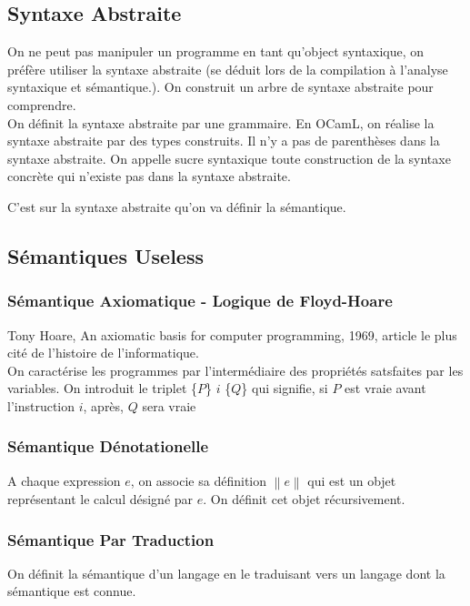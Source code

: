 \documentclass{cours}
\begin{document}
\subsection{Syntaxe Abstraite}
On ne peut pas manipuler un programme en tant qu'object syntaxique, on préfère utiliser la syntaxe abstraite (se déduit lors de la compilation à l'analyse syntaxique et sémantique.). On construit un arbre de syntaxe abstraite pour comprendre.\\
On définit la syntaxe abstraite par une grammaire. En OCamL, on réalise la syntaxe abstraite par des types construits. Il n'y a pas de parenthèses dans la syntaxe abstraite. On appelle sucre syntaxique toute construction de la syntaxe concrète qui n'existe pas dans la syntaxe abstraite.

C'est sur la syntaxe abstraite qu'on va définir la sémantique.

\subsection{Sémantiques Useless}
\subsubsection{Sémantique Axiomatique - Logique de Floyd-Hoare}
Tony Hoare, An axiomatic basis for computer programming, 1969, article le plus cité de l'histoire de l'informatique.\\
On caractérise les programmes par l'intermédiaire des propriétés satsfaites par les variables. On introduit le triplet \{$P$\} $i$ \{$Q$\} qui signifie, si $P$ est vraie avant l'instruction $i$, après, $Q$ sera vraie

\subsubsection{Sémantique Dénotationelle}
A chaque expression $e$, on associe sa définition $\left\lVert e\right\rVert $ qui est un objet représentant le calcul désigné par $e$. On définit cet objet récursivement.\\

\subsubsection{Sémantique Par Traduction}
On définit la sémantique d'un langage en le traduisant vers un langage dont la sémantique est connue. 
\end{document}
